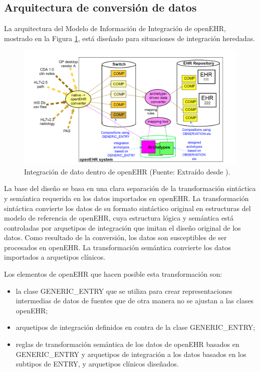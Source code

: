 \subsection{Arquitectura de conversión de datos}

La arquitectura del Modelo de Información de Integración de openEHR, mostrado en la Figura \ref{fig:data_conversion_architecture}, está diseñado para situaciones de integración heredadas.

\begin{figure}[h]
  \centering
  \includegraphics[scale=0.4]{./images/data_conversion_architecture}
  \caption{Integración de dato dentro de openEHR (Fuente: Extraído desde \cite{openEHR}).}
  \label{fig:data_conversion_architecture}
\end{figure}

La base del diseño se basa en una clara separación de la transformación sintáctica y semántica requerida en los datos importados en openEHR. La transformación sintáctica convierte los datos de su formato sintáctico original en estructuras del modelo de referencia de openEHR, cuya estructura lógica y semántica está controladas por arquetipos de integración que imitan el diseño original de los datos. Como resultado de la conversión, los datos son susceptibles de ser procesados en openEHR. La transformación semántica convierte los datos importados a arquetipos clínicos.

Los elementos de openEHR que hacen posible esta transformación son:
\begin{itemize}
  \item la clase GENERIC\_ENTRY que se utiliza para crear representaciones intermedias de datos de fuentes que de otra manera no se ajustan a las clases openEHR;
  \item arquetipos de integración definidos en contra de la clase GENERIC\_ENTRY;
  \item reglas de transformación semántica de los datos de openEHR basados en GENERIC\_ENTRY y arquetipos de integración a los datos basados en los subtipos de ENTRY, y arquetipos clínicos diseñados.
\end{itemize}

